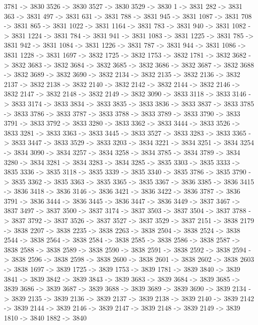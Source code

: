 {	3781 -> 3830
	3526 -> 3830
	3527 -> 3830
	3529 -> 3830
	1 -> 3831
	282 -> 3831
	363 -> 3831
	497 -> 3831
	631 -> 3831
	788 -> 3831
	945 -> 3831
	1087 -> 3831
	708 -> 3831
	865 -> 3831
	1022 -> 3831
	1164 -> 3831
	783 -> 3831
	940 -> 3831
	1082 -> 3831
	1224 -> 3831
	784 -> 3831
	941 -> 3831
	1083 -> 3831
	1225 -> 3831
	785 -> 3831
	942 -> 3831
	1084 -> 3831
	1226 -> 3831
	787 -> 3831
	944 -> 3831
	1086 -> 3831
	1228 -> 3831
	1697 -> 3832
	1725 -> 3832
	1753 -> 3832
	1781 -> 3832
	3682 -> 3832
	3683 -> 3832
	3684 -> 3832
	3685 -> 3832
	3686 -> 3832
	3687 -> 3832
	3688 -> 3832
	3689 -> 3832
	3690 -> 3832
	2134 -> 3832
	2135 -> 3832
	2136 -> 3832
	2137 -> 3832
	2138 -> 3832
	2140 -> 3832
	2142 -> 3832
	2144 -> 3832
	2146 -> 3832
	2147 -> 3832
	2148 -> 3832
	2149 -> 3832
	3090 -> 3833
	3118 -> 3833
	3146 -> 3833
	3174 -> 3833
	3834 -> 3833
	3835 -> 3833
	3836 -> 3833
	3837 -> 3833
	3785 -> 3833
	3786 -> 3833
	3787 -> 3833
	3788 -> 3833
	3789 -> 3833
	3790 -> 3833
	3791 -> 3833
	3792 -> 3833
	3280 -> 3833
	3362 -> 3833
	3444 -> 3833
	3526 -> 3833
	3281 -> 3833
	3363 -> 3833
	3445 -> 3833
	3527 -> 3833
	3283 -> 3833
	3365 -> 3833
	3447 -> 3833
	3529 -> 3833
	3203 -> 3834
	3221 -> 3834
	3251 -> 3834
	3254 -> 3834
	3090 -> 3834
	3257 -> 3834
	3258 -> 3834
	3785 -> 3834
	3789 -> 3834
	3280 -> 3834
	3281 -> 3834
	3283 -> 3834
	3285 -> 3835
	3303 -> 3835
	3333 -> 3835
	3336 -> 3835
	3118 -> 3835
	3339 -> 3835
	3340 -> 3835
	3786 -> 3835
	3790 -> 3835
	3362 -> 3835
	3363 -> 3835
	3365 -> 3835
	3367 -> 3836
	3385 -> 3836
	3415 -> 3836
	3418 -> 3836
	3146 -> 3836
	3421 -> 3836
	3422 -> 3836
	3787 -> 3836
	3791 -> 3836
	3444 -> 3836
	3445 -> 3836
	3447 -> 3836
	3449 -> 3837
	3467 -> 3837
	3497 -> 3837
	3500 -> 3837
	3174 -> 3837
	3503 -> 3837
	3504 -> 3837
	3788 -> 3837
	3792 -> 3837
	3526 -> 3837
	3527 -> 3837
	3529 -> 3837
	2151 -> 3838
	2179 -> 3838
	2207 -> 3838
	2235 -> 3838
	2263 -> 3838
	2504 -> 3838
	2524 -> 3838
	2544 -> 3838
	2564 -> 3838
	2584 -> 3838
	2585 -> 3838
	2586 -> 3838
	2587 -> 3838
	2588 -> 3838
	2589 -> 3838
	2590 -> 3838
	2591 -> 3838
	2592 -> 3838
	2594 -> 3838
	2596 -> 3838
	2598 -> 3838
	2600 -> 3838
	2601 -> 3838
	2602 -> 3838
	2603 -> 3838
	1697 -> 3839
	1725 -> 3839
	1753 -> 3839
	1781 -> 3839
	3840 -> 3839
	3841 -> 3839
	3842 -> 3839
	3843 -> 3839
	3683 -> 3839
	3684 -> 3839
	3685 -> 3839
	3686 -> 3839
	3687 -> 3839
	3688 -> 3839
	3689 -> 3839
	3690 -> 3839
	2134 -> 3839
	2135 -> 3839
	2136 -> 3839
	2137 -> 3839
	2138 -> 3839
	2140 -> 3839
	2142 -> 3839
	2144 -> 3839
	2146 -> 3839
	2147 -> 3839
	2148 -> 3839
	2149 -> 3839
	1810 -> 3840
	1882 -> 3840
}
